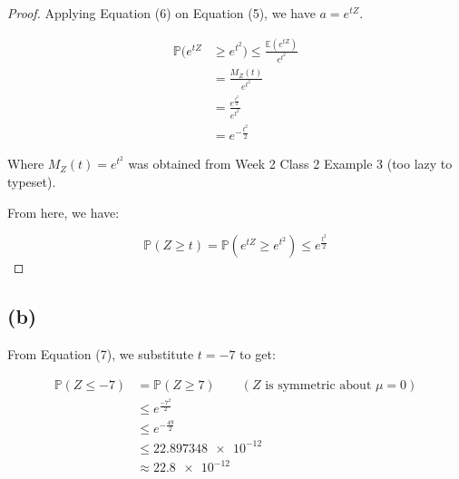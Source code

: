 \documentclass[12pt]{article}
\begin{document}
\begin{proof} Applying Equation (6) on Equation (5), we have $a = e^{tZ}$. 

\begin{align*}
    \mathbb{P}(e^{tZ} &\geq e^{t^{2}}) \leq \frac{ \mathbb{E}(e^{tZ})}{e^{t^{2}}} \\ 
    &= \frac{M_Z (t)}{e^{t^{2}}} \\ 
    &= \frac{e^{\frac{t^{2}}{2}}}{e^{t^{2}}} \\ 
    &= e^{-\frac{t^{2}}{2}}
\end{align*}

\noindent Where $M_Z (t) = e^{t^{2}}$ was obtained from Week 2 Class 2 Example 3 (too lazy to typeset).

\noindent From here, we have:

\begin{equation}
    \boxed{ \mathbb{P}(Z \geq t) = \mathbb{P}(e^{tZ} \geq e^{t^{2}}) \leq e^{\frac{t^{2}}{2}}}
\end{equation}

\end{proof}

\subsection*{(b)}
From Equation (7), we substitute $t = -7$ to get: 

\begin{align*}
    \mathbb{P}(Z \leq -7) &= \mathbb{P}(Z \geq 7) \qquad (\text{$Z$ is symmetric about $\mu=0$}) \\ 
    &\leq  e^{\frac{-7^{2}}{2}} \\ 
    &\leq  e^{-\frac{49}{2}} \\ 
    &\leq  \num{22.897348e-12} \\ 
    &\approx \boxed{\num{22.8e-12}}
\end{align*}
\end{document}
